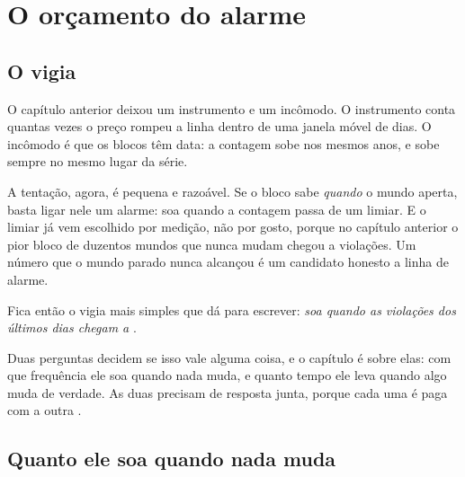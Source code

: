 %
%

\chapter{O orçamento do alarme}
\label{cap:orcamento}

\section{O vigia}

O capítulo anterior deixou um instrumento e um incômodo. O instrumento conta quantas vezes o
preço rompeu a linha dentro de uma janela móvel de \numVigiaBloco{} dias. O incômodo é que os
blocos têm data: a contagem sobe nos mesmos anos, e sobe sempre no mesmo lugar da série.

A tentação, agora, é pequena e razoável. Se o bloco sabe \emph{quando} o mundo aperta, basta
ligar nele um alarme: soa quando a contagem passa de um limiar. E o limiar já vem escolhido
por medição, não por gosto, porque no capítulo anterior o pior bloco de duzentos mundos que
nunca mudam chegou a \numNuncaMudaPiorBloco{} violações. Um número que o mundo parado nunca
alcançou é um candidato honesto a linha de alarme.

Fica então o vigia mais simples que dá para escrever: \emph{soa quando as violações dos
últimos \numVigiaBloco{} dias chegam a \numVigiaLimiar}.

Duas perguntas decidem se isso vale alguma coisa, e o capítulo é sobre elas: com que
frequência ele soa quando nada muda, e quanto tempo ele leva quando algo muda de verdade. As
duas precisam de resposta junta, porque cada uma é paga com a outra \cite{wald1945sequential}.

\section{Quanto ele soa quando nada muda}

